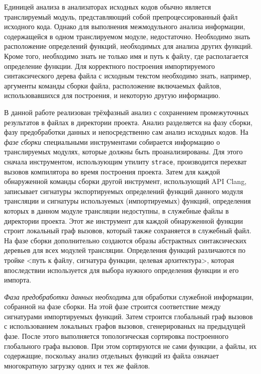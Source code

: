 Единицей анализа в анализаторах исходных кодов обычно является транслируемый модуль, представляющий собой препроцессированный файл исходного кода. Однако для выполнения межмодульного анализа информации, содержащейся в одном транслируемом модуле, недостаточно. Необходимо знать расположение определений функций, необходимых для анализа других функций. Кроме того, необходимо знать не только имя и путь к файлу, где располагается определение функции. Для корректного построения импортируемого синтаксического дерева файла с исходным текстом необходимо знать, например, аргументы команды сборки файла, расположение включаемых файлов, использовавшихся для построения, и некоторую другую информацию.

В данной работе реализован трёхфазный анализ с сохранением промежуточных результатов в файлах в директории проекта. Анализ разделяется на фазу сборки, фазу предобработки данных и непосредственно сам анализ исходных кодов. На \textit{фазе сборки} специальными инструментами собирается информацию о транслируемых модулях, которые должны быть проанализированы. Для этого сначала инструментом, использующим утилиту \texttt{strace}, производится перехват вызовов компилятора во время построения проекта. Затем для каждой обнаруженной команды сборки другой инструмент, использующий API Clang, записывает сигнатуры экспортируемых определений функций данного модуля трансляции и сигнатуры используемых (импортируемых) функций, определения которых в данном модуле трансляции недоступны, в служебные файлы в директории проекта. Этот же инструмент для каждой обнаруженной функции строит локальный граф вызовов, который также сохраняется в служебный файл. На фазе сборки дополнительно создаются образы абстрактных синтаксических деревьев для всех модулей трансляции. Определения функций различаются по тройке <путь к файлу, сигнатура функции, целевая архитектура>, которая впоследствии используется для выбора нужного определения функции и его импорта.

\textit{Фаза предобработки данных} необходима для обработки служебной информации, собранной на фазе сборки. На этой фазе строится соответствие между сигнатурами импортируемых функций. Затем строится глобальный граф вызовов с использованием локальных графов вызовов, сгенерированых на предыдущей фазе. После этого выполняется топологическая сортировка построенного глобального графа вызовов. При этом сортируются не сами функции, а файлы, их содержащие, поскольку анализ отдельных функций из файла означает многократную загрузку одних и тех же файлов.


